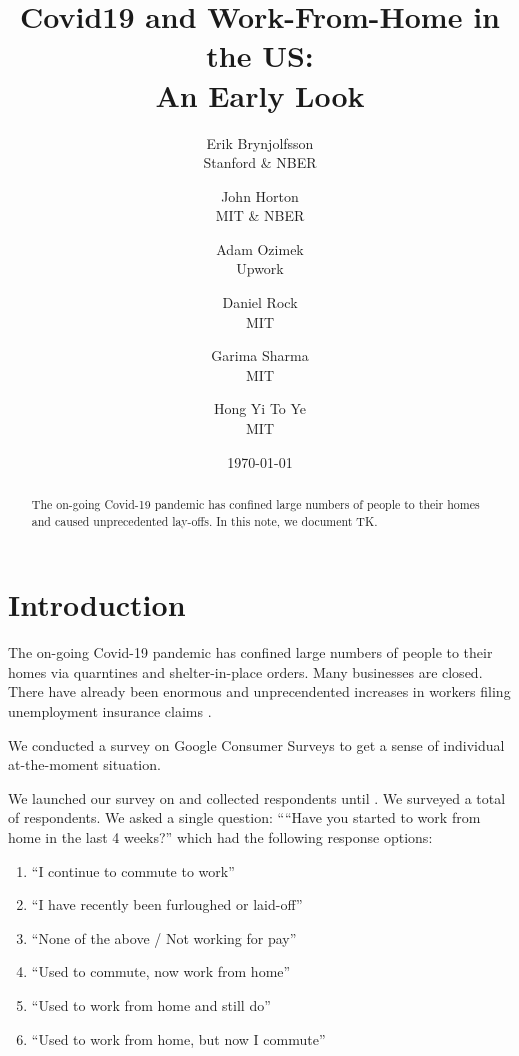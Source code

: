 \documentclass[12pt]{article}
\newcommand{\covid}{Covid-19}
\begin{document}
 

\title{Covid19 and Work-From-Home in the US:\\ An Early Look}

\date{\today}

\author{Erik Brynjolfsson\\Stanford \& NBER \and John Horton\\MIT \& NBER \and Adam Ozimek\\Upwork \and Daniel Rock\\MIT \and Garima Sharma\\MIT \and Hong Yi To Ye\\MIT}

\maketitle

\begin{abstract}
  \noindent The on-going \covid{} pandemic has confined large numbers of people to their homes and caused unprecedented lay-offs.
  In this note, we document TK. 
  \newline 
\end{abstract} 

\onehalfspacing 

\section{Introduction}
The on-going \covid{} pandemic has confined large numbers of people to their homes via quarntines and shelter-in-place orders.
Many businesses are closed. 
There have already been enormous and unprecendented increases in workers filing unemployment insurance claims \citep{goldsmith2020}. 

We conducted a survey on Google Consumer Surveys to get a sense of individual at-the-moment situation. 

We launched our survey on \SurveyStart{} and collected respondents until \SurveyEnd{}. 
We surveyed a total of \numObs{} respondents.
We asked a single question:
````Have you started to work from home in the last 4 weeks?''
which had the following response options: 

\begin{enumerate} 
\item ``I continue to commute to work''
\item ``I have recently been furloughed or laid-off''
\item ``None of the above / Not working for pay''
\item ``Used to commute, now work from home''   
\item ``Used to work from home and still do''       
\item ``Used to work from home, but now I commute''
\end{enumerate} 
\end{document}
